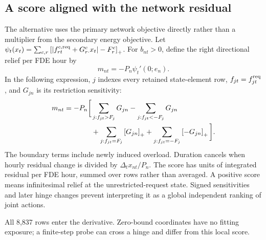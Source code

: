 \documentclass[10pt,journal]{IEEEtran}
\newcommand{\pos}[1]{\left[#1\right]_+}
\begin{document}
\subsection{A score aligned with the network residual}
The alternative uses the primary network objective directly rather than a multiplier from the secondary energy objective. Let
$\psi_t(x_t)=\sum_{c,r}\pos{|f_{rt}^{c,\rm req}+G^c_{r\cdot}x_t|-F_r^c}$.
For $b_{nt}>0$, define the right directional relief per FDE hour by
\begin{equation}
m_{nt}=-P_n\psi_t'(0;e_n).
\label{eq:score}
\end{equation}
In the following expression, $j$ indexes every retained state-element row, $f_{jt}=f_{jt}^{\rm req}$, and $G_{jn}$ is its restriction sensitivity:
\begin{align}
m_{nt}=-P_n\bigg[&\sum_{j:f_{jt}>F_j}G_{jn}-\sum_{j:f_{jt}<-F_j}G_{jn}\notag\\
&+\sum_{j:f_{jt}=F_j}\pos{G_{jn}}
+\sum_{j:f_{jt}=-F_j}\pos{-G_{jn}}\bigg].
\label{eq:scoreexplicit}
\end{align}
The boundary terms include newly induced overload. Duration cancels when hourly residual change is divided by $\Delta_tx_{nt}/P_n$. The score has units of integrated residual per FDE hour, summed over rows rather than averaged. A positive score means infinitesimal relief at the unrestricted-request state. Signed sensitivities and later hinge changes prevent interpreting it as a global independent ranking of joint actions.

All 8,837 rows enter the derivative. Zero-bound coordinates have no fitting exposure; a finite-step probe can cross a hinge and differ from this local score.
\end{document}
